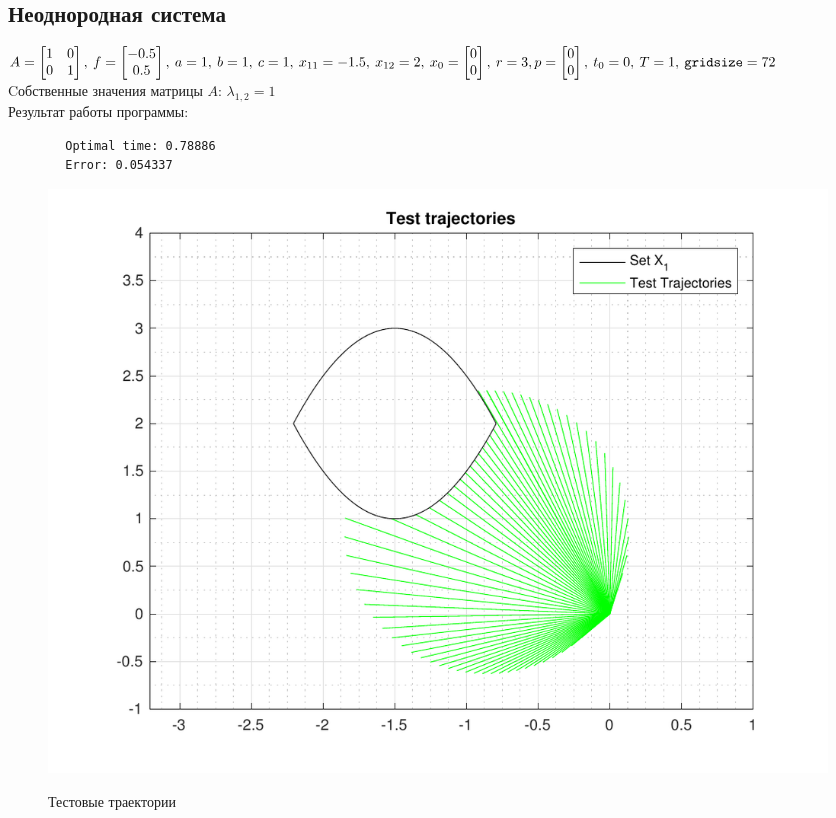 \documentclass[11pt, oneside, final]{article}
\theoremstyle{break}
\numberwithin{equation}{section}
\theoremstyle{plain}
\theoremstyle{definition}
\begin{document}
    \subsection{Неоднородная система}
    \(A = \begin{bmatrix} 1 & 0 \\ 0 & 1 \end{bmatrix},\:f = \begin{bmatrix} -0.5 \\ 0.5 \end{bmatrix},\: a = 1,\: b = 1,\: c = 1,\: x_{11} = -1.5,\: x_{12} = 2,\: x_0 =  \begin{bmatrix} 0 \\ 0 \end{bmatrix}, \: r = 3, \\ p = \begin{bmatrix} 0 \\ 0 \end{bmatrix}, \: t_0 = 0, \: T = 1, \: \mathtt{gridsize} = 72 \)\\
    Cобственные значения матрицы \(A\): \(\lambda_{1, 2} = 1\)\\
    Результат работы программы: 
    \begin{verbatim}
        Optimal time: 0.78886
        Error: 0.054337
    \end{verbatim}
    \begin{figure}[H]
            \centering
            \includegraphics[width=\linewidth]{s2fig1}
            \label{pic:s2:1}
            \caption{Тестовые траектории}
    \end{figure}
\end{document}
